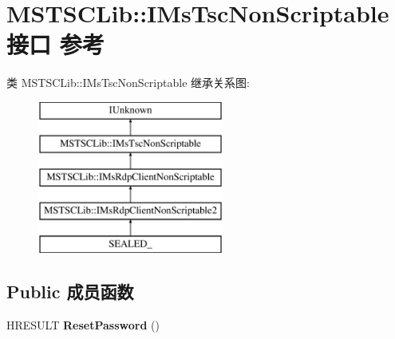 \hypertarget{interface_m_s_t_s_c_lib_1_1_i_ms_tsc_non_scriptable}{}\section{M\+S\+T\+S\+C\+Lib\+:\+:I\+Ms\+Tsc\+Non\+Scriptable接口 参考}
\label{interface_m_s_t_s_c_lib_1_1_i_ms_tsc_non_scriptable}
类 M\+S\+T\+S\+C\+Lib\+:\+:I\+Ms\+Tsc\+Non\+Scriptable 继承关系图\+:\begin{figure}[H]
\begin{center}
\leavevmode
\includegraphics[height=5.000000cm]{interface_m_s_t_s_c_lib_1_1_i_ms_tsc_non_scriptable}
\end{center}
\end{figure}
\subsection*{Public 成员函数}
\begin{DoxyCompactItemize}
\item 
\mbox{\label{interface_m_s_t_s_c_lib_1_1_i_ms_tsc_non_scriptable_a18fb808495254f2a9e824ebba55b6b33}} 
H\+R\+E\+S\+U\+LT {\bfseries Reset\+Password} ()
\end{DoxyCompactItemize}
